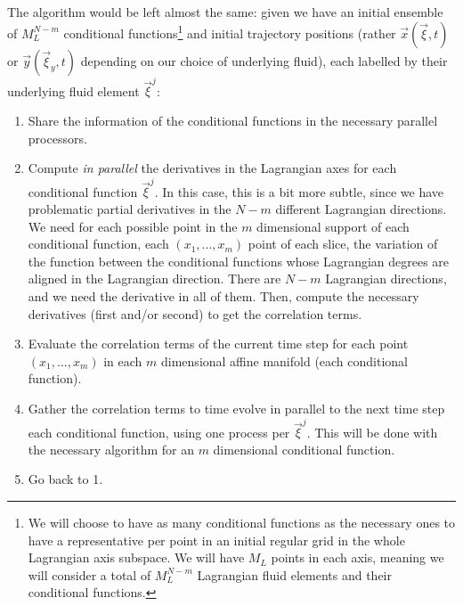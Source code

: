 \documentclass[11pt, a4paper]{article} %
\begin{document}
The algorithm would be left almost the same: given we have an initial ensemble of $M_L^{N-m}$ conditional functions\footnote{We will choose to have as many conditional functions as the necessary ones to have a representative per point in an initial regular grid in the whole Lagrangian axis subspace. We will have $M_L$ points in each axis, meaning we will consider a total of $M_L^{N-m}$ Lagrangian fluid elements and their conditional functions.} and initial trajectory positions (rather $\vec{x}(\vec{\xi},t)$ or $\vec{y}(\vec{\xi}_y,t)$ depending on our choice of underlying fluid), each labelled by their underlying fluid element $\vec{\xi}^j$:
\begin{enumerate}
\item Share the information of the conditional functions in the necessary parallel processors.
\item Compute {\em in parallel} the derivatives in the Lagrangian axes for each conditional function $\vec{\xi}^j$. In this case, this is a bit more subtle, since we have problematic partial derivatives in the $N-m$ different Lagrangian directions. We need for each possible point in the $m$ dimensional support of each conditional function, each $(x_1,...,x_{m})$ point of each slice, the variation of the function between the conditional functions whose Lagrangian degrees are aligned in the Lagrangian direction. There are $N-m$ Lagrangian directions, and we need the derivative in all of them. Then, compute the necessary derivatives (first and/or second) to get the correlation terms.
\item Evaluate the correlation terms of the current time step for each point $(x_1,...,x_{m})$ in each $m$ dimensional affine manifold (each conditional function).

\item Gather the correlation terms to time evolve in parallel to the next time step each conditional function, using one process per $\vec{\xi}^j$. This will be done with the necessary algorithm for an $m$ dimensional conditional function.
\item Go back to 1.
\end{enumerate}
\end{document}
